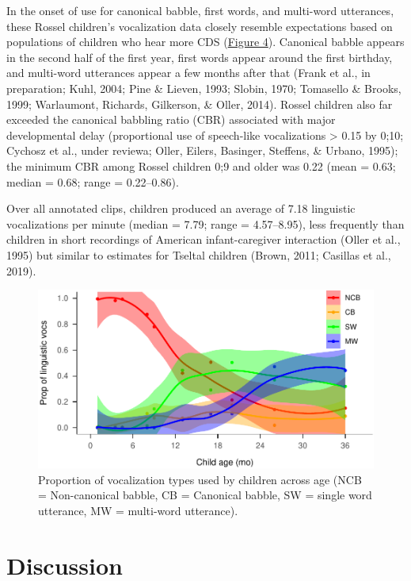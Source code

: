 \documentclass[,man,floatsintext]{apa6}
\begin{document}
In the onset of use for canonical babble, first words, and multi-word
utterances, these Rossel children's vocalization data closely resemble
expectations based on populations of children who hear more CDS
(\protect\hyperlink{fig4}{Figure 4}). Canonical babble appears in the
second half of the first year, first words appear around the first
birthday, and multi-word utterances appear a few months after that
(Frank et al., in preparation; Kuhl, 2004; Pine \& Lieven, 1993; Slobin,
1970; Tomasello \& Brooks, 1999; Warlaumont, Richards, Gilkerson, \&
Oller, 2014). Rossel children also far exceeded the canonical babbling
ratio (CBR) associated with major developmental delay (proportional use
of speech-like vocalizations \textgreater{} 0.15 by 0;10; Cychosz et
al., under reviewa; Oller, Eilers, Basinger, Steffens, \& Urbano, 1995);
the minimum CBR among Rossel children 0;9 and older was 0.22 (mean =
0.63; median = 0.68; range = 0.22--0.86).

Over all annotated clips, children produced an average of 7.18
linguistic vocalizations per minute (median = 7.79; range = 4.57--8.95),
less frequently than children in short recordings of American
infant-caregiver interaction (Oller et al., 1995) but similar to
estimates for Tseltal children (Brown, 2011; Casillas et al., 2019).

\begin{figure}
\centering
\includegraphics{Yeli-CLE_files/figure-latex/fig4-1.pdf}
\caption{\label{fig:fig4}Proportion of vocalization types used by children
across age (NCB = Non-canonical babble, CB = Canonical babble, SW =
single word utterance, MW = multi-word utterance).}
\end{figure}

\section{Discussion}\label{disc}
\end{document}
